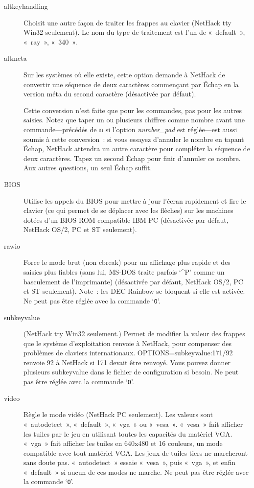 \documentclass[titlepage]{article}
\begin{document}
\begin{description}
\item[{altkeyhandling}]
Choisit une autre façon de traiter les frappes au clavier (NetHack tty
Win32 seulement).
Le nom du type de traitement est l'un de «~default~», «~ray~»,
«~340~».

\item[{altmeta}]
Sur les systèmes où elle existe, cette option demande à NetHack de convertir
une séquence de deux caractères commençant par Échap en la version méta du
second caractère (désactivée par défaut).


Cette conversion n'est faite que pour les commandes, pas pour les autres
saisies.
Notez que taper un ou plusieurs chiffres comme nombre avant une
commande---précédés de \textbf{n} si l'option
\textit{number\_pad}
est réglée---est aussi soumis à cette conversion~: si vous essayez
d'annuler le nombre en tapant Échap, NetHack attendra un autre caractère
pour compléter la séquence de deux caractères.
Tapez un second Échap pour finir d'annuler ce nombre.
Aux autres questions, un seul Échap suffit.

\item[{BIOS}]
Utilise les appels du BIOS pour mettre à jour l'écran rapidement et lire le
clavier (ce qui permet de se déplacer avec les flèches) sur les machines
dotées d'un BIOS ROM compatible IBM PC (désactivée par défaut, NetHack OS/2,
PC et ST seulement).

\item[{rawio}]
Force le mode brut (non cbreak) pour un affichage plus rapide et des
saisies plus fiables (sans lui, MS-DOS traite parfois `\textasciicircum{}P' comme un
basculement de l'imprimante) (désactivée par défaut, NetHack OS/2, PC et ST
seulement).
Note~: les DEC Rainbow se bloquent si elle est activée.
Ne peut pas être réglée avec la commande `\texttt{O}'.

\item[{subkeyvalue}]
(NetHack tty Win32 seulement.)
Permet de modifier la valeur des frappes que le système d'exploitation
renvoie à NetHack, pour compenser des problèmes de claviers
internationaux.
OPTIONS=subkeyvalue:171/92
renvoie 92 à NetHack si 171 devait être renvoyé.
Vous pouvez donner plusieurs subkeyvalue dans le fichier de configuration
si besoin.
Ne peut pas être réglée avec la commande `\texttt{O}'.

\item[{video}]
Règle le mode vidéo (NetHack PC seulement).
Les valeurs sont «~autodetect~», «~default~», «~vga~» ou
«~vesa~».
«~vesa~» fait afficher les tuiles par le jeu en utilisant toutes les
capacités du matériel VGA.
«~vga~» fait afficher les tuiles en 640x480 et 16 couleurs, un mode
compatible avec tout matériel VGA.
Les jeux de tuiles tiers ne marcheront sans doute pas.
«~autodetect~» essaie «~vesa~», puis «~vga~», et enfin
«~default~» si aucun de ces modes ne marche.
Ne peut pas être réglée avec la commande `\texttt{O}'.


\end{description}
\end{document}
